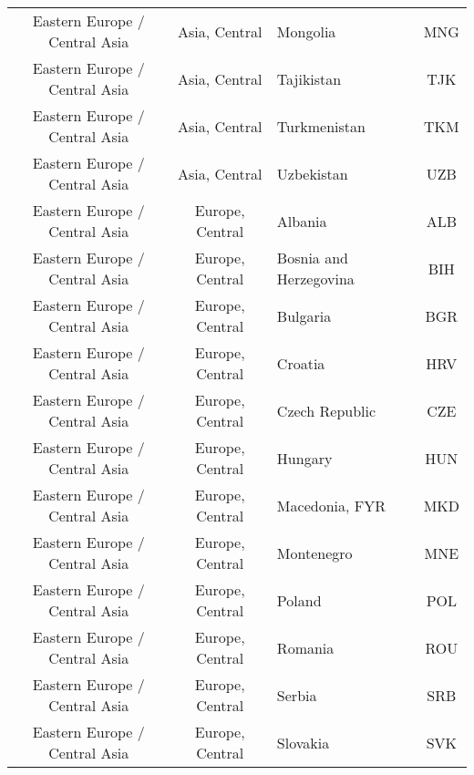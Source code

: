 \begin{landscape}
\begin{longtable}{|c|c|p{5cm}|c|}
 Eastern Europe / Central Asia &                Asia, Central &                                          Mongolia &  MNG \\
 Eastern Europe / Central Asia &                Asia, Central &                                        Tajikistan &  TJK \\
 Eastern Europe / Central Asia &                Asia, Central &                                      Turkmenistan &  TKM \\
 Eastern Europe / Central Asia &                Asia, Central &                                        Uzbekistan &  UZB \\
 Eastern Europe / Central Asia &              Europe, Central &                                           Albania &  ALB \\
 Eastern Europe / Central Asia &              Europe, Central &                            Bosnia and Herzegovina &  BIH \\
 Eastern Europe / Central Asia &              Europe, Central &                                          Bulgaria &  BGR \\
 Eastern Europe / Central Asia &              Europe, Central &                                           Croatia &  HRV \\
 Eastern Europe / Central Asia &              Europe, Central &                                    Czech Republic &  CZE \\
 Eastern Europe / Central Asia &              Europe, Central &                                           Hungary &  HUN \\
 Eastern Europe / Central Asia &              Europe, Central &                                    Macedonia, FYR &  MKD \\
 Eastern Europe / Central Asia &              Europe, Central &                                        Montenegro &  MNE \\
 Eastern Europe / Central Asia &              Europe, Central &                                            Poland &  POL \\
 Eastern Europe / Central Asia &              Europe, Central &                                           Romania &  ROU \\
 Eastern Europe / Central Asia &              Europe, Central &                                            Serbia &  SRB \\
 Eastern Europe / Central Asia &              Europe, Central &                                          Slovakia &  SVK \\

\end{longtable}
\end{landscape}
